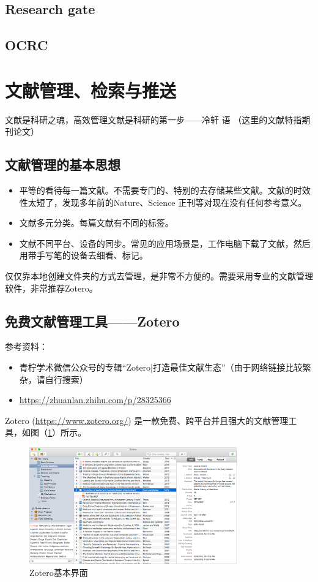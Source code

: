 \subsection{Research gate}


\subsection{OCRC}




\section{文献管理、检索与推送}
文献是科研之魂，高效管理文献是科研的第一步——冷轩 \quad 语 （这里的文献特指期刊论文）
\subsection{文献管理的基本思想}
\begin{itemize}
\item 平等的看待每一篇文献。不需要专门的、特别的去存储某些文献。文献的时效性太短了，发现多年前的Nature、Science 正刊等对现在没有任何参考意义。

\item 文献多元分类。每篇文献有不同的标签。

\item 文献不同平台、设备的同步。常见的应用场景是，工作电脑下载了文献，然后用带手写笔的设备去细看、标记。
\end{itemize}
仅仅靠本地创建文件夹的方式去管理，是非常不方便的。需要采用专业的文献管理软件，非常推荐Zotero。





\subsection{免费文献管理工具——Zotero}
参考资料：
\begin{itemize}
\item 青柠学术微信公众号的专辑“Zotero|打造最佳文献生态”（由于网络链接比较繁杂，请自行搜索）
\item \url{https://zhuanlan.zhihu.com/p/28325366}
\end{itemize}


Zotero (\url{https://www.zotero.org/}) 是一款免费、跨平台并且强大的文献管理工具，如图（\ref{fig566}）所示。
\begin{figure}[h!]
\centering
\includegraphics[width=0.8\textwidth]{pictures/zotero.png}
\caption{Zotero基本界面}
\label{fig566}
\end{figure}




